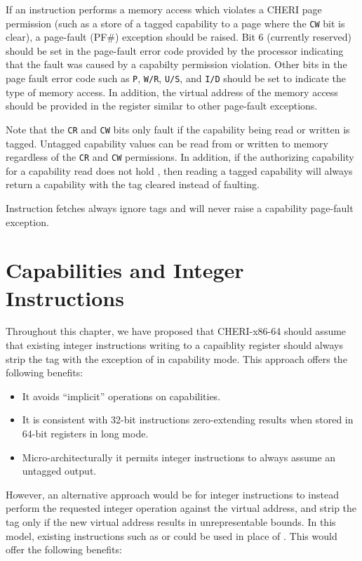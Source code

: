 If an instruction performs a memory access which violates a CHERI page
permission (such as a store of a tagged capability to a page where the
\texttt{CW} bit is clear), a page-fault (PF\#) exception should be
raised.  Bit 6 (currently reserved) should be set in the page-fault
error code provided by the processor indicating that the fault was
caused by a capabilty permission violation.  Other bits in the page
fault error code such as \texttt{P}, \texttt{W/R}, \texttt{U/S}, and
\texttt{I/D} should be set to indicate the type of memory access.  In
addition, the virtual address of the memory access should be provided
in the \CRTWO{} register similar to other page-fault exceptions.

Note that the \texttt{CR} and \texttt{CW} bits only fault if the
capability being read or written is tagged.  Untagged capability
values can be read from or written to memory regardless of the
\texttt{CR} and \texttt{CW} permissions.  In addition, if the
authorizing capability for a capability read does not hold \cappermLC,
then reading a tagged capability will always return a capability with
the tag cleared instead of faulting.

Instruction fetches always ignore tags and will never raise a
capability page-fault exception.

\section{Capabilities and Integer Instructions}

Throughout this chapter, we have proposed that CHERI-x86-64 should
assume that existing integer instructions writing to a capaiblity
register should always strip the tag with the exception of
 in capability mode.  This approach offers the
following benefits:

\begin{itemize}
\item
It avoids ``implicit'' operations on capabilities.
\item
It is consistent with 32-bit instructions zero-extending results when
stored in 64-bit registers in long mode.
\item
Micro-architecturally it permits integer instructions to always assume
an untagged output.
\end{itemize}

However, an alternative approach would be for integer instructions to
instead perform the requested integer operation against the virtual
address, and strip the tag only if the new virtual address results in
unrepresentable bounds.  In this model, existing instructions such as
 or  could be used in
place of .  This would offer the following
benefits:

